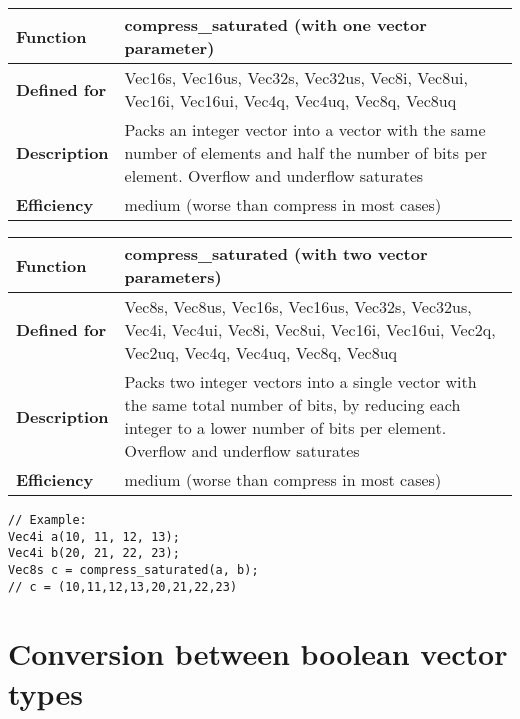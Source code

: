 \documentclass[vcl_manual.tex]{subfiles}
\begin{document}
\begin{tabular}{|p{30mm}|p{120mm}|}
\hline
\bfseries Function & compress\_saturated (with one vector parameter) \\ \hline
\bfseries Defined for & Vec16s, Vec16us, Vec32s, Vec32us, Vec8i, Vec8ui, Vec16i, Vec16ui, Vec4q, Vec4uq, Vec8q, Vec8uq \\ \hline
\bfseries Description & Packs an integer vector into a vector with the same number of elements and half the number of bits per element. 
Overflow and underflow saturates \\ \hline
\bfseries Efficiency & medium (worse than compress in most cases) \\ \hline
\end{tabular}

\begin{tabular}{|p{30mm}|p{120mm}|}
\hline
\bfseries Function & compress\_saturated (with two vector parameters) \\ \hline
\bfseries Defined for & Vec8s, Vec8us, Vec16s, Vec16us, Vec32s, Vec32us, 
Vec4i, Vec4ui, Vec8i, Vec8ui, Vec16i, Vec16ui,  
Vec2q, Vec2uq, Vec4q, Vec4uq, Vec8q, Vec8uq \\ \hline

\bfseries Description & Packs two integer vectors into a single vector with the same total number of bits, by reducing each integer to a lower number of bits per element. 
Overflow and underflow saturates \\ \hline
\bfseries Efficiency & medium (worse than compress in most cases) \\ \hline
\end{tabular}
\begin{lstlisting}[frame=none]
// Example:
Vec4i a(10, 11, 12, 13);
Vec4i b(20, 21, 22, 23);
Vec8s c = compress_saturated(a, b);
// c = (10,11,12,13,20,21,22,23)
\end{lstlisting}




\section{Conversion between boolean vector types}\label{ConversionBetweenBooleanTypes}
\end{document}
